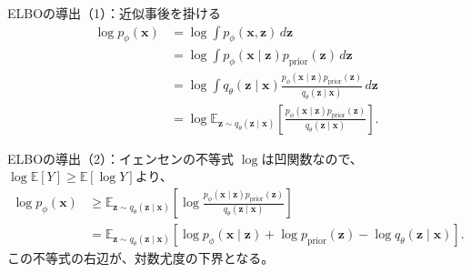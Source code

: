 \begin{frame}{ELBOの導出（1）：近似事後を掛ける}
    \small
    \begin{align*}
        \log p_\phi(\boldsymbol{x})
        &=
        \log\int
        p_\phi(\boldsymbol{x},\boldsymbol{z})\,d\boldsymbol{z}\\[4pt]
        &=
        \log\int
        p_\phi(\boldsymbol{x}\mid\boldsymbol{z})
        p_{\mathrm{prior}}(\boldsymbol{z})\,d\boldsymbol{z}\\[4pt]
        &=
        \log\int
        q_\theta(\boldsymbol{z}\mid\boldsymbol{x})
        \frac{
        p_\phi(\boldsymbol{x}\mid\boldsymbol{z})
        p_{\mathrm{prior}}(\boldsymbol{z})
        }{
        q_\theta(\boldsymbol{z}\mid\boldsymbol{x})
        }
        \,d\boldsymbol{z}\\[4pt]
        &=
        \log
        \mathbb{E}_{\boldsymbol{z}\sim
        q_\theta(\boldsymbol{z}\mid\boldsymbol{x})}
        \left[
        \frac{
        p_\phi(\boldsymbol{x}\mid\boldsymbol{z})
        p_{\mathrm{prior}}(\boldsymbol{z})
        }{
        q_\theta(\boldsymbol{z}\mid\boldsymbol{x})
        }
        \right].
    \end{align*}
    \normalsize

\end{frame}
\begin{frame}{ELBOの導出（2）：イェンセンの不等式}
    \small
    $\log$は凹関数なので、
    $\log\mathbb{E}[Y]\geq\mathbb{E}[\log Y]$より、
    \begin{align*}
        \log p_\phi(\boldsymbol{x})
        &\geq
        \mathbb{E}_{\boldsymbol{z}\sim
        q_\theta(\boldsymbol{z}\mid\boldsymbol{x})}
        \left[
        \log
        \frac{
        p_\phi(\boldsymbol{x}\mid\boldsymbol{z})
        p_{\mathrm{prior}}(\boldsymbol{z})
        }{
        q_\theta(\boldsymbol{z}\mid\boldsymbol{x})
        }
        \right]\\[5pt]
        &=
        \mathbb{E}_{\boldsymbol{z}\sim
        q_\theta(\boldsymbol{z}\mid\boldsymbol{x})}
        \left[
        \log p_\phi(\boldsymbol{x}\mid\boldsymbol{z})
        +\log p_{\mathrm{prior}}(\boldsymbol{z})
        -\log q_\theta(\boldsymbol{z}\mid\boldsymbol{x})
        \right].
    \end{align*}
    \normalsize
    この不等式の右辺が、対数尤度の下界となる。
\end{frame}
